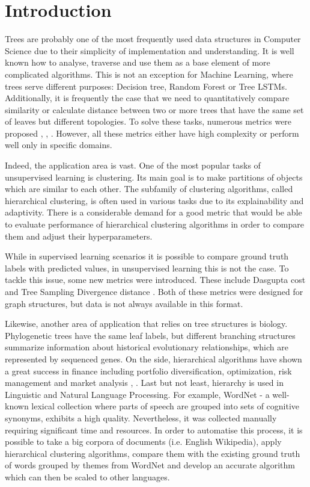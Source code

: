 \chapter{Introduction}
\label{intro}
Trees are probably one of the most frequently used data structures in Computer Science due to their simplicity of implementation and understanding. It is well known how to analyse, traverse and use them as a base element of more complicated algorithms. This is not an exception for Machine Learning, where trees serve different purposes: Decision tree, Random Forest or Tree LSTMs. Additionally, it is frequently the case that we need to quantitatively compare similarity or calculate distance between two or more trees that have the same set of leaves but different topologies. 
To solve these tasks, numerous metrics were proposed  \cite{RF2013}, \cite{Zhang1989}, \cite{Penny1982}. However, all these metrics either have high complexity or perform well only in specific domains.  

Indeed, the application area is vast. One of the most popular tasks of unsupervised learning is clustering. Its main goal is to make partitions of objects which are similar to each other. The subfamily of clustering algorithms, called hierarchical clustering, is often used in various tasks due to its explainability and adaptivity. 
There is a considerable demand for a good metric that would be able to evaluate performance of hierarchical clustering algorithms in order to compare them and adjust their hyperparameters. 

While in supervised learning scenarios it is possible to compare ground truth labels with predicted values, in unsupervised learning this is not the case. To tackle this issue, some new metrics were introduced. These include Dasgupta cost \cite{dasgupta2016cost} and Tree Sampling Divergence distance \cite{tsd2019}. Both of these metrics were designed for graph structures, but data is not always available in this format. 

Likewise, another area of application that relies on tree structures is biology. Phylogenetic trees have the same leaf labels, but different branching structures summarize information about historical evolutionary relationships, which are represented by sequenced genes. On the side, hierarchical algorithms have shown a great success in finance including portfolio diversification, optimization, risk management and market analysis \cite{Papenbrock2011_1000025469}, \cite{Gallegati2008}. Last but not least, hierarchy is used in Linguistic and Natural Language Processing. For example, WordNet \cite{wordnet} - a well-known lexical collection where parts of speech are grouped into sets of cognitive synonyms, exhibits a high quality. Nevertheless, it was collected manually requiring significant time and resources. In order to automatise this process, it is possible to take a big corpora of documents (i.e. English Wikipedia), apply hierarchical clustering algorithms, compare them with the existing ground truth of words grouped by themes from WordNet and develop an accurate algorithm which can then be scaled to other languages.

